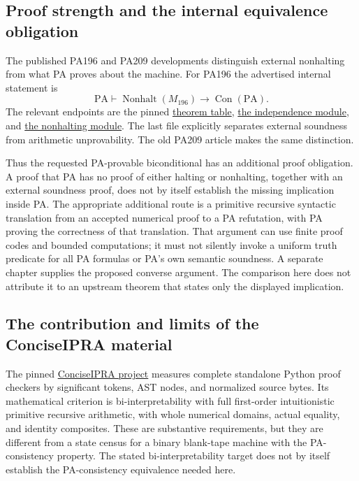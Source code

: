 \subsection{Proof strength and the internal equivalence obligation}
The published PA196 and PA209 developments distinguish external nonhalting
from what PA proves about the machine.  For PA196 the advertised internal
statement is
\[
 \mathrm{PA}\vdash
 \operatorname{Nonhalt}(M_{196})\longrightarrow\operatorname{Con}(\mathrm{PA}).
\]
The relevant endpoints are the pinned
\href{https://github.com/jamesyc/BusyBeaver/blob/407cdc356f6b586635e71ac92be394255f4bfea4/docs/result.md}{theorem table},
\href{https://github.com/jamesyc/BusyBeaver/blob/407cdc356f6b586635e71ac92be394255f4bfea4/PA196/Independence.lean}{the independence module},
and
\href{https://github.com/jamesyc/BusyBeaver/blob/407cdc356f6b586635e71ac92be394255f4bfea4/PA196/Nonhalting.lean}{the nonhalting module}.
The last file explicitly separates external soundness from arithmetic
unprovability.  The old PA209 article makes the same distinction.

Thus the requested PA-provable biconditional has an additional proof
obligation.  A proof that PA has no proof of either halting or nonhalting,
together with an external soundness proof, does not by itself establish the
missing implication inside PA.  The appropriate additional route is a
primitive recursive syntactic translation from an accepted numerical proof
to a PA refutation, with PA proving the correctness of that translation.
That argument can use finite proof codes and bounded computations; it must
not silently invoke a uniform truth predicate for all PA formulas or PA's
own semantic soundness.  A separate chapter supplies the proposed converse
argument.  The comparison here does not attribute it to an upstream theorem
that states only the displayed implication.

\subsection{The contribution and limits of the ConciseIPRA material}
The pinned
\href{https://github.com/VladimirReshetnikov/ProveIt/tree/6ce5acc401f0c84be90dc5c38dc1487e391122c6/Logic/PrimitiveRecursiveArithmetic/ConciseIPRA}{ConciseIPRA project}
measures complete standalone Python proof checkers by significant tokens,
AST nodes, and normalized source bytes.  Its mathematical criterion is
bi-interpretability with full first-order intuitionistic primitive recursive
arithmetic, with whole numerical domains, actual equality, and identity
composites.  These are substantive requirements, but they are different from
a state census for a binary blank-tape machine with the PA-consistency
property.  The stated bi-interpretability target does not by itself establish
the PA-consistency equivalence needed here.

